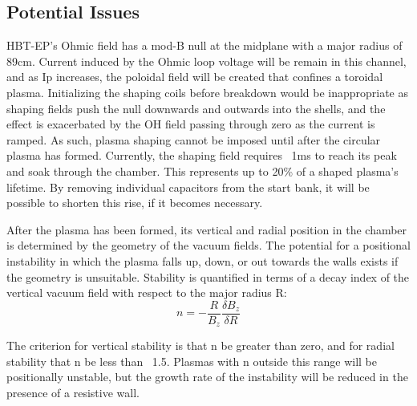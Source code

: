 \documentclass[aps,prl,twocolumn,superscriptaddress,groupedaddress]{revtex4}  %
\begin{document}
\subsection{Potential Issues}
	HBT-EP's Ohmic field has a mod-B null at the midplane with a major radius of 89cm.  Current induced by the Ohmic loop voltage will be remain in this channel, and as Ip increases, the poloidal field will be created that confines a toroidal plasma.  Initializing the shaping coils before breakdown would be inappropriate as shaping fields push the null downwards and outwards into the shells, and the effect is exacerbated by the OH field passing through zero as the current is ramped.  As such, plasma shaping cannot be imposed until after the circular plasma has formed.  Currently, the shaping field requires ~1ms to reach its peak and soak through the chamber.  This represents up to 20\% of a shaped plasma's lifetime.  By removing individual capacitors from the start bank, it will be possible to shorten this rise, if it becomes necessary.\par
	After the plasma has been formed, its vertical and radial position in the chamber is determined by the geometry of the vacuum fields.  The potential for a positional instability in which the plasma falls up, down, or out towards the walls exists if the geometry is unsuitable.  Stability is quantified in terms of a decay index of the vertical vacuum field with respect to the major radius R:$$n = -\frac{R}{B_z}\frac{\delta B_z}{\delta R}$$\par
	The criterion for vertical stability is that n be greater than zero, and for radial stability that n be less than ~1.5.  Plasmas with n outside this range will be positionally unstable, but the growth rate of the instability will be reduced in the presence of a resistive wall\cite{Fukuyama}.%
\end{document}
